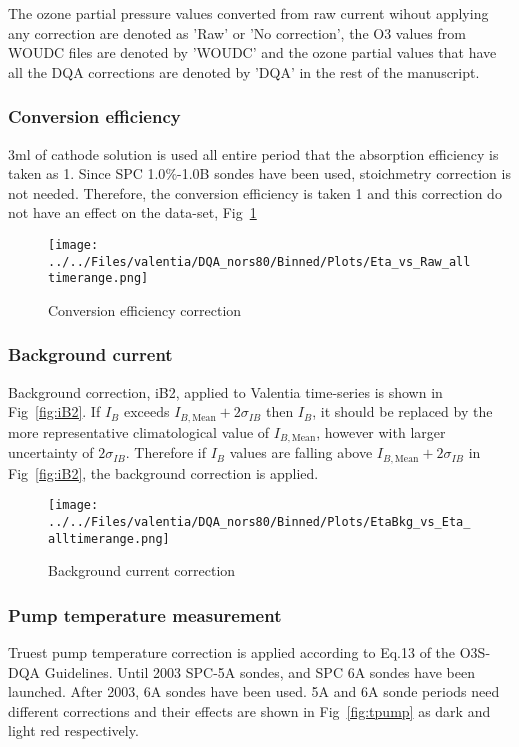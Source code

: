 \documentclass{article}
\begin{document}
The ozone partial pressure values converted from raw current
wihout applying any correction are denoted as 'Raw' or 'No correction', the O3 values from WOUDC files are denoted
by 'WOUDC' and the ozone partial values that have all the DQA corrections
are denoted by 'DQA' in the rest of the manuscript.

%
    \subsubsection{Conversion efficiency}
3ml of cathode solution is used all entire period that the absorption efficiency is taken as 1.
Since SPC 1.0$\%$-1.0B sondes have been used, stoichmetry correction is not needed. Therefore,
the conversion efficiency is taken 1 and this correction do not have an effect on the data-set, Fig~\ref{fig:eta}

%
                \begin{figure}
        \centering
\texttt{[image: ../../Files/valentia/DQA\_nors80/Binned/Plots/Eta\_vs\_Raw\_alltimerange.png]}
    \caption{Conversion efficiency correction}
            \label{fig:eta}
    \end{figure}

        \subsubsection{Background current}
        Background correction, iB2, applied to Valentia time-series is shown in Fig~\ref{fig:iB2}. If $I_B$ exceeds
$I_{B,\text{Mean}}+2\sigma_{IB}$ then $I_B$, it
should be replaced by the more representative climatological value of $I_{B,\text{Mean}}$, however with
larger uncertainty of $2\sigma_{IB}$.
Therefore if $I_B$ values are falling above $I_{B,\text{Mean}}+2\sigma_{IB}$ in Fig~\ref{fig:iB2}, the background correction is applied.
                \begin{figure}
        \centering
\texttt{[image: ../../Files/valentia/DQA\_nors80/Binned/Plots/EtaBkg\_vs\_Eta\_alltimerange.png]}
    \caption{Background current correction}
            \label{fig:bkg}
    \end{figure}
            \subsubsection{Pump temperature measurement}
 Truest pump temperature correction is applied according to Eq.13 of the O3S-DQA Guidelines. Until 2003 SPC-5A sondes,
 and SPC 6A sondes have been launched. After 2003, 6A sondes have been used. 5A and 6A sonde periods need different corrections and
 their effects are shown in Fig~\ref{fig:tpump} as dark and light red respectively.
\end{document}
